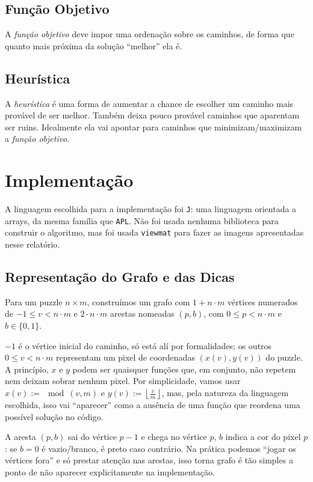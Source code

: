 \documentclass{article}
\newcommand{\lang}{\texttt{J}}
\newcommand{\inlcode}{\texttt}
\begin{document}
\subsection{Função Objetivo}
A \emph{função objetivo} deve impor
uma ordenação sobre os caminhos,
de forma que quanto mais próxima da solução
``melhor'' ela é.

\subsection{Heurística}
A \emph{heurística} é uma forma de aumentar a chance de escolher
um caminho mais provável de ser melhor.
Também deixa pouco provável
caminhos que aparentam ser ruins.
Idealmente ela vai apontar para caminhos que
minimizam/maximizam a \emph{função objetivo}.

\section{Implementação}

A linguagem escolhida para a implementação foi \lang{}:
uma linguagem orientada a arrays,
da mesma família que  \texttt{APL}.
Não foi usada nenhuma biblioteca para construir o algoritmo,
mas foi usada \inlcode{viewmat} para fazer as imagens
apresentadas nesse relatório.

\subsection{Representação do Grafo e das Dicas}
Para um puzzle \(n \times m\),
construímos um grafo com \(1 + n \cdot m\) vértices
numerados de \(-1 \le v < n \cdot m\) e
\(2 \cdot n \cdot m\) arestas nomeadas \((p, b)\),
com \(0 \le p < n \cdot m\) e \(b \in \{0, 1\}\).

\(-1\) é o vértice inicial do caminho,
só está alí por formalidades;
os outros \(0 \le v < n \cdot m\)
representam um pixel de coordenadas \((x(v), y(v))\) do puzzle.
A princípio, \(x\) e \(y\) podem ser quaisquer
funções que, em conjunto,
não repetem nem deixam sobrar nenhum pixel.
Por simplicidade, vamos usar
\(x(v) := \!\!\!\mod\!\!(v, m)\) e
\(y(v) := \left\lfloor\frac{v}{m}\right\rfloor\),
mas, pela natureza da linguagem escolhida,
isso vai ``aparecer'' como a ausência de uma função
que reordena uma possível solução no código.

A aresta \((p, b)\) sai do vértice \(p-1\) e
chega no vértice \(p\),
\(b\) indica a cor do pixel \(p\):
se \(b = 0\) é vazio/branco,
é preto caso contrário.
Na prática podemos ``jogar os vértices fora''
e só prestar atenção nas arestas,
isso torna grafo é tão simples
a ponto de não aparecer explicitamente na implementação.
\end{document}
